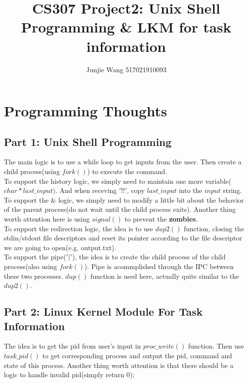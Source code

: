 \documentclass[12pt]{extarticle}
\title{CS307 Project2: Unix Shell Programming \& LKM for task information}
\author{Junjie Wang 517021910093}
\newcommand{\<}{\langle}
\renewcommand{\>}{\rangle}
\theoremstyle{definition}
\begin{document}
	\maketitle 
	\section{Programming Thoughts}
	\subsection{Part 1: Unix Shell Programming}
	The main logic is to use a while loop to get inputs from the user. Then create a child process(using $fork()$) to execute the command. \\
	To support the history logic, we simply need to maintain one more variable($char *last\_input)$. And when receving $'!!'$, copy $last\_input$ into the $input$ string.\\ 
	To support the \& logic, we simply need to modify a little bit about the behavior of the parent process(do not wait until the child process exits). Another thing worth attention here is using $signal()$ to prevent the \textbf{zombies}.\\
	To support the redirection logic, the idea is to use $dup2()$ function, closing the stdin/stdout file descriptors and reset its pointer according to the file descriptor we are going to open(e.g. output.txt). \\
	To support the pipe($'|'$), the idea is to create the child process of the child process(also using $fork()$). Pipe is acommplished through the IPC between these two processes. $dup()$ function is used here, actually quite similar to the $dup2()$.
	\subsection{Part 2: Linux Kernel Module For Task Information}
	The idea is to get the pid from user's input in $proc\_write()$ function. Then use $task\_pid()$ to get corresponding process and output the pid, command and state of this process. Another thing worth attention is that there should be a logic to handle invalid pid(simply return 0);
\end{document}
